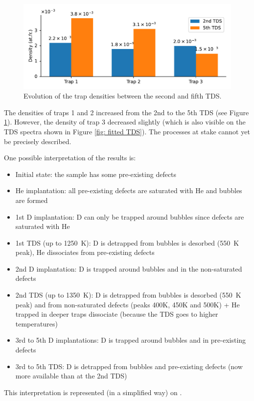 \begin{figure}
    \centering
    \includegraphics[width=\linewidth]{Figures/Chapter5/trap_densities.pdf}
    \caption{Evolution of the trap densities between the second and fifth TDS.}
    \label{fig:density evolution}
\end{figure}

The densities of traps 1 and 2 increased from the 2nd to the 5th TDS (see Figure \ref{fig:density evolution}).
However, the density of trap 3 decreased slightly (which is also visible on the TDS spectra shown in Figure \ref{fig: fitted TDS}).
The processes at stake cannot yet be precisely described. 

One possible interpretation of the results is:
\begin{itemize}
    \item Initial state: the sample has some pre-existing defects %
    \item He implantation: all pre-existing defects are saturated with He and bubbles are formed
    \item 1st D implantation: D can only be trapped around bubbles since defects are saturated with He
    \item 1st TDS (up to \SI{1250}{K}): D is detrapped from bubbles is desorbed (\SI{550}{K} peak), He dissociates from pre-existing defects 
    \item 2nd D implantation: D is trapped around bubbles and in the non-saturated defects
    \item 2nd TDS (up to \SI{1350}{K}): D is detrapped from bubbles is desorbed (\SI{550}{K} peak) and from non-saturated defects (peaks 400K, 450K and 500K) + He trapped in deeper traps dissociate (because the TDS goes to higher temperatures)
    \item 3rd to 5th D implantations: D is trapped around bubbles and in pre-existing defects
    \item 3rd to 5th TDS: D is detrapped from bubbles and pre-existing defects (now more available than at the 2nd TDS)
\end{itemize}
This interpretation is represented (in a simplified way) on .


